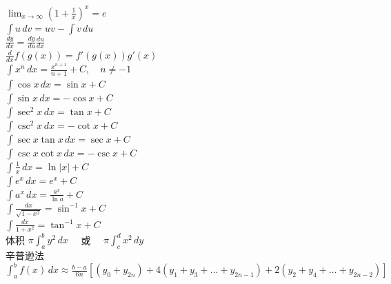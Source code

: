 \begin{minipage}[t]{0.5\textwidth}
$\lim_{x \to \infty} (1 + \frac{1}{x})^{x} = e$ \\[8pt]
$\int u \, dv = uv - \int v \, du$ \\[8pt]
$\frac{dy}{dx} = \frac{dy}{du} \frac{du}{dx}$ \\[8pt]
$\frac{d}{dx}f(g(x)) = f'(g(x))g'(x)$ \\[8pt]
$\int x^{n} \, dx = \frac{x^{n+1}}{n+1} + C, \quad n \neq -1$ \\[8pt]
$\int \cos x \, dx = \sin x + C$ \\[8pt]
$\int \sin x \, dx = -\cos x + C$ \\[8pt]
$\int \sec^{2}x \, dx = \tan x + C$ \\[8pt]
$\int \csc^{2}x \, dx = -\cot x + C$ \\[8pt]
$\int \sec x \tan x \, dx = \sec x + C$ \\[8pt]
$\int \csc x \cot x \, dx = -\csc x + C$ \\[8pt]
$\int \frac{1}{x} \, dx = \ln|x| + C$ \\[8pt]
$\int e^{x} \, dx = e^{x} + C$ \\[8pt]
$\int a^{x} \, dx = \frac{a^{x}}{\ln a} + C$ \\[8pt]
$\int \frac{dx}{\sqrt{1-x^{2}}} = \sin^{-1}x + C$ \\[8pt]
$\int \frac{dx}{1+x^{2}} = \tan^{-1}x + C$ \\[15pt]
体积 \quad $\pi \int_{a}^{b} y^{2} \, dx \quad$ 或 $\quad \pi \int_{c}^{d} x^{2} \, dy$ \\[45pt]
辛普逊法 \\
$\int_{a}^{b} f(x) \, dx \approx \frac{b-a}{6n} \left[ (y_{0} + y_{2n}) + 4(y_{1} + y_{3} + \dots + y_{2n-1}) + 2(y_{2} + y_{4} + \dots + y_{2n-2}) \right]$
\end{minipage}
